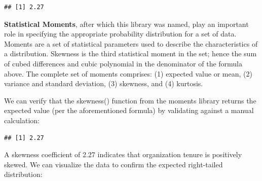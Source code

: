 \documentclass[]{book}
\newenvironment{Shaded}{\begin{snugshade}}{\end{snugshade}}
\newcommand{\CommentTok}[1]{\textcolor[rgb]{0.56,0.35,0.01}{\textit{#1}}}
\newcommand{\DecValTok}[1]{\textcolor[rgb]{0.00,0.00,0.81}{#1}}
\newcommand{\KeywordTok}[1]{\textcolor[rgb]{0.13,0.29,0.53}{\textbf{#1}}}
\newcommand{\NormalTok}[1]{#1}
\newcommand{\OperatorTok}[1]{\textcolor[rgb]{0.81,0.36,0.00}{\textbf{#1}}}
\newcommand{\StringTok}[1]{\textcolor[rgb]{0.31,0.60,0.02}{#1}}
\begin{document}
\begin{verbatim}
## [1] 2.27
\end{verbatim}

\textbf{Statistical Moments}, after which this library was named, play an important role in specifying the appropriate probability distribution for a set of data. Moments are a set of statistical parameters used to describe the characteristics of a distribution. Skewness is the third statistical moment in the set; hence the sum of cubed differences and cubic polynomial in the denominator of the formula above. The complete set of moments comprises: (1) expected value or mean, (2) variance and standard deviation, (3) skewness, and (4) kurtosis.

We can verify that the skewness() function from the moments library returns the expected value (per the aforementioned formula) by validating against a manual calculation:

\begin{Shaded}
\end{Shaded}

\begin{verbatim}
## [1] 2.27
\end{verbatim}

A skewness coefficient of 2.27 indicates that organization tenure is positively skewed. We can visualize the data to confirm the expected right-tailed distribution:
\end{document}
